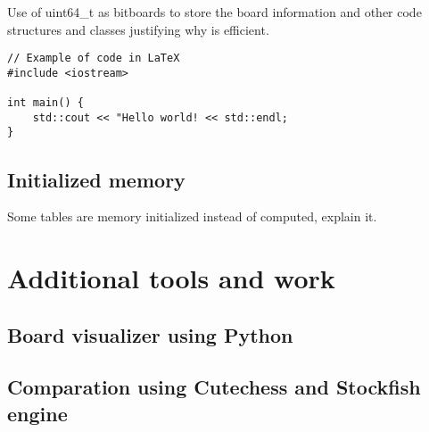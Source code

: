 Use of uint64\_t as bitboards to store the board information and other code structures and classes justifying why is efficient.

\begin{lstlisting}
// Example of code in LaTeX
#include <iostream>

int main() {
    std::cout << "Hello world! << std::endl;
}
\end{lstlisting}

\subsection{Initialized memory}

Some tables are memory initialized instead of computed, explain it.

\section{Additional tools and work}

\subsection{Board visualizer using Python}

\subsection{Comparation using Cutechess and Stockfish engine}

